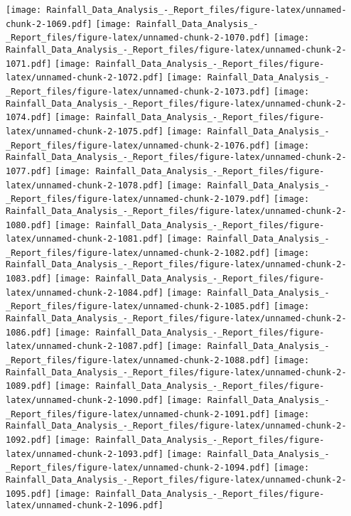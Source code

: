 \documentclass[
]{article}
\begin{document}
\texttt{[image: Rainfall\_Data\_Analysis\_-\_Report\_files/figure-latex/unnamed-chunk-2-1069.pdf]}
\texttt{[image: Rainfall\_Data\_Analysis\_-\_Report\_files/figure-latex/unnamed-chunk-2-1070.pdf]}
\texttt{[image: Rainfall\_Data\_Analysis\_-\_Report\_files/figure-latex/unnamed-chunk-2-1071.pdf]}
\texttt{[image: Rainfall\_Data\_Analysis\_-\_Report\_files/figure-latex/unnamed-chunk-2-1072.pdf]}
\texttt{[image: Rainfall\_Data\_Analysis\_-\_Report\_files/figure-latex/unnamed-chunk-2-1073.pdf]}
\texttt{[image: Rainfall\_Data\_Analysis\_-\_Report\_files/figure-latex/unnamed-chunk-2-1074.pdf]}
\texttt{[image: Rainfall\_Data\_Analysis\_-\_Report\_files/figure-latex/unnamed-chunk-2-1075.pdf]}
\texttt{[image: Rainfall\_Data\_Analysis\_-\_Report\_files/figure-latex/unnamed-chunk-2-1076.pdf]}
\texttt{[image: Rainfall\_Data\_Analysis\_-\_Report\_files/figure-latex/unnamed-chunk-2-1077.pdf]}
\texttt{[image: Rainfall\_Data\_Analysis\_-\_Report\_files/figure-latex/unnamed-chunk-2-1078.pdf]}
\texttt{[image: Rainfall\_Data\_Analysis\_-\_Report\_files/figure-latex/unnamed-chunk-2-1079.pdf]}
\texttt{[image: Rainfall\_Data\_Analysis\_-\_Report\_files/figure-latex/unnamed-chunk-2-1080.pdf]}
\texttt{[image: Rainfall\_Data\_Analysis\_-\_Report\_files/figure-latex/unnamed-chunk-2-1081.pdf]}
\texttt{[image: Rainfall\_Data\_Analysis\_-\_Report\_files/figure-latex/unnamed-chunk-2-1082.pdf]}
\texttt{[image: Rainfall\_Data\_Analysis\_-\_Report\_files/figure-latex/unnamed-chunk-2-1083.pdf]}
\texttt{[image: Rainfall\_Data\_Analysis\_-\_Report\_files/figure-latex/unnamed-chunk-2-1084.pdf]}
\texttt{[image: Rainfall\_Data\_Analysis\_-\_Report\_files/figure-latex/unnamed-chunk-2-1085.pdf]}
\texttt{[image: Rainfall\_Data\_Analysis\_-\_Report\_files/figure-latex/unnamed-chunk-2-1086.pdf]}
\texttt{[image: Rainfall\_Data\_Analysis\_-\_Report\_files/figure-latex/unnamed-chunk-2-1087.pdf]}
\texttt{[image: Rainfall\_Data\_Analysis\_-\_Report\_files/figure-latex/unnamed-chunk-2-1088.pdf]}
\texttt{[image: Rainfall\_Data\_Analysis\_-\_Report\_files/figure-latex/unnamed-chunk-2-1089.pdf]}
\texttt{[image: Rainfall\_Data\_Analysis\_-\_Report\_files/figure-latex/unnamed-chunk-2-1090.pdf]}
\texttt{[image: Rainfall\_Data\_Analysis\_-\_Report\_files/figure-latex/unnamed-chunk-2-1091.pdf]}
\texttt{[image: Rainfall\_Data\_Analysis\_-\_Report\_files/figure-latex/unnamed-chunk-2-1092.pdf]}
\texttt{[image: Rainfall\_Data\_Analysis\_-\_Report\_files/figure-latex/unnamed-chunk-2-1093.pdf]}
\texttt{[image: Rainfall\_Data\_Analysis\_-\_Report\_files/figure-latex/unnamed-chunk-2-1094.pdf]}
\texttt{[image: Rainfall\_Data\_Analysis\_-\_Report\_files/figure-latex/unnamed-chunk-2-1095.pdf]}
\texttt{[image: Rainfall\_Data\_Analysis\_-\_Report\_files/figure-latex/unnamed-chunk-2-1096.pdf]}
\end{document}
